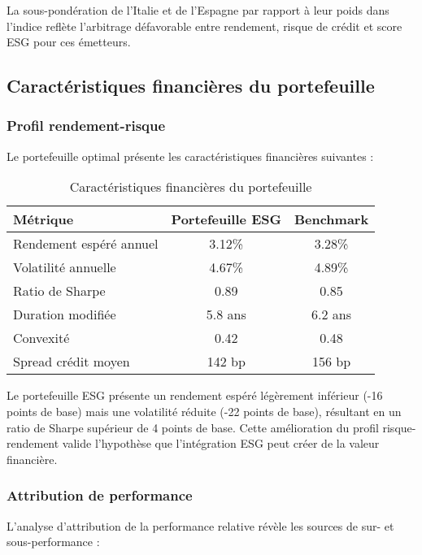 La sous-pondération de l'Italie et de l'Espagne par rapport à leur poids dans l'indice reflète l'arbitrage défavorable entre rendement, risque de crédit et score ESG pour ces émetteurs.

\subsection{Caractéristiques financières du portefeuille}

\subsubsection{Profil rendement-risque}

Le portefeuille optimal présente les caractéristiques financières suivantes :

\begin{table}[h!]
\centering
\begin{tabular}{lcc}
\hline
\textbf{Métrique} & \textbf{Portefeuille ESG} & \textbf{Benchmark} \\
\hline
Rendement espéré annuel & 3.12\% & 3.28\% \\
Volatilité annuelle & 4.67\% & 4.89\% \\
Ratio de Sharpe & 0.89 & 0.85 \\
Duration modifiée & 5.8 ans & 6.2 ans \\
Convexité & 0.42 & 0.48 \\
Spread crédit moyen & 142 bp & 156 bp \\
\hline
\end{tabular}
\caption{Caractéristiques financières du portefeuille}
\end{table}

Le portefeuille ESG présente un rendement espéré légèrement inférieur (-16 points de base) mais une volatilité réduite (-22 points de base), résultant en un ratio de Sharpe supérieur de 4 points de base. Cette amélioration du profil risque-rendement valide l'hypothèse que l'intégration ESG peut créer de la valeur financière.

\subsubsection{Attribution de performance}

L'analyse d'attribution de la performance relative révèle les sources de sur- et sous-performance :

